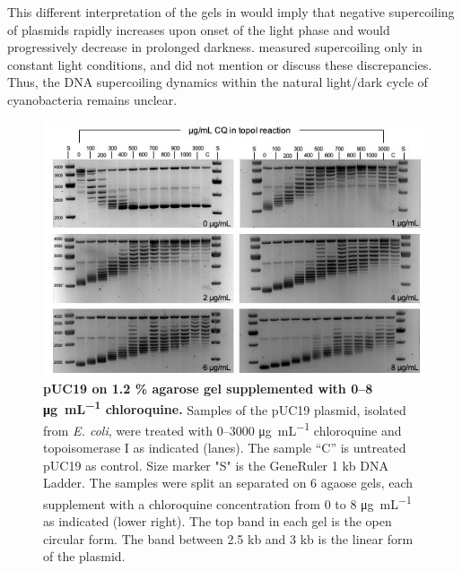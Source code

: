 \documentclass[10pt,a4]{article}
\newcommand{\ugml}{\micro\gram\per\milli\liter}
\begin{document}
This different interpretation of the gels in \citet{Woelfle2007} would
imply that negative supercoiling of plasmids rapidly increases upon
onset of the light phase and would progressively decrease in prolonged
darkness.  \citet{Vijayan2009} measured supercoiling only in constant
light conditions, and did not mention or discuss these discrepancies.
Thus, the DNA supercoiling dynamics within the natural light/dark
cycle of cyanobacteria remains unclear.

\begin{figure}[ht!]
    \includegraphics[width=\textwidth]{figures/keller_puc19.jpg}
  \caption{\textbf{pUC19 on 1.2 \% agarose gel supplemented with 0--8
      \si{\ugml} chloroquine.} Samples of the pUC19 plasmid, isolated
    from \textit{E. coli}, were treated with 0--3000 \si{\ugml}
    chloroquine and topoisomerase I as indicated (lanes). The sample
    “C” is untreated pUC19 as control. Size marker "S" is the
    GeneRuler 1 kb DNA Ladder. The samples were split an separated on
    6 agaose gels, each supplement with a chloroquine concentration
    from 0 to 8 \si{\ugml} as indicated (lower right). The top band
    in each gel is the open circular form. The band between  2.5 kb and 3 kb
    is the linear form of the plasmid.}
  \label{fig:keller} 
\end{figure}
\end{document}
